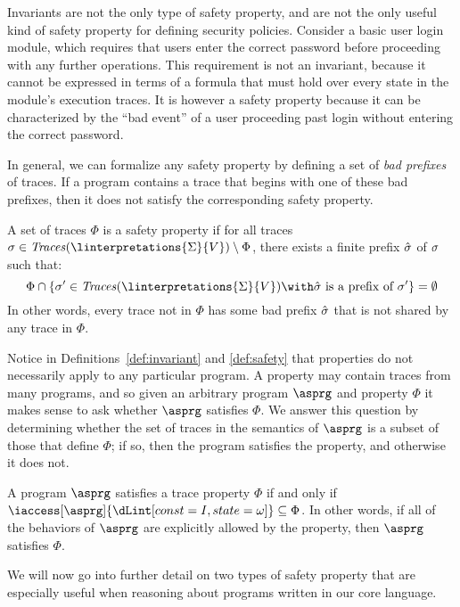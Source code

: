 \documentclass[11pt,twoside]{scrartcl}
\begin{document}
Invariants are not the only type of safety property, and are not the only useful kind of safety property for defining security policies. Consider a basic user login module, which requires that users enter the correct password before proceeding with any further operations. This requirement is not an invariant, because it cannot be expressed in terms of a formula that must hold over every state in the module's execution traces. It is however a safety property because it can be characterized by the ``bad event'' of a user proceeding past login without entering the correct password.

In general, we can formalize any safety property by defining a set of \emph{bad prefixes} of traces. If a program contains a trace that begins with one of these bad prefixes, then it does not satisfy the corresponding safety property.

\begin{definition}
\label{def:safety}
A set of traces $\Phi$ is a safety property if for all traces $\atrace \in  \ttraces{\linterpretations{\Sigma}{V}}\setminus\Phi$, there exists a finite prefix $\hat{\sigma}$ of $\sigma$ such that:
\[
\Phi \cap \{\atrace' \in  \ttraces{\linterpretations{\Sigma}{V}} \with \hat{\sigma}~\text{is a prefix of}~\atrace'\} = \emptyset
\]
In other words, every trace not in $\Phi$ has some bad prefix $\hat{\sigma}$ that is not shared by any trace in $\Phi$.
\end{definition}

Notice in Definitions~\ref{def:invariant} and \ref{def:safety} that properties do not necessarily apply to any particular program. A property may contain traces from many programs, and so given an arbitrary program $\asprg$ and property $\Phi$ it makes sense to ask whether $\asprg$ satisfies $\Phi$. We answer this question by determining whether the set of traces in the semantics of $\asprg$ is a subset of those that define $\Phi$; if so, then the program satisfies the property, and otherwise it does not.

\begin{definition}
\label{def:invariant-sat}
A program $\asprg$ satisfies a trace property $\Phi$ if and only if $\iaccess[\asprg]{\I} \subseteq \Phi$. In other words, if all of the behaviors of $\asprg$ are explicitly allowed by the property, then $\asprg$ satisfies $\Phi$.
\end{definition}

We will now go into further detail on two types of safety property that are especially useful when reasoning about programs written in our core language.
\end{document}
